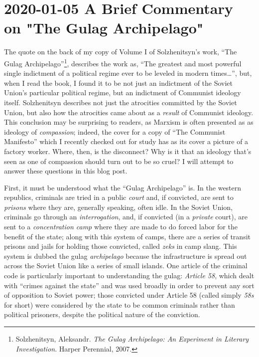 \documentclass{article}
\begin{document}
\section{2020-01-05 A Brief Commentary on "The Gulag Archipelago"}
The quote on the back of my copy of Volume I of Solzhenitsyn's work, ``The Gulag Archipelago''\footnote{Solzhenitsyn, Aleksandr. \textit{The Gulag Archipelago: An Experiment in Literary Investigation}.  Harper Perennial, 2007.}, describes the work as, ``The greatest and most powerful single indictment of a political regime ever to be leveled in modern times\ldots'', but, when I read the book, I found it to be not just an indictment of the Soviet Union's particular political regime, but an indictment of Communist ideology itself.  Solzhenitsyn describes not just the atrocities committed by the Soviet Union, but also how the atrocities came about as a \emph{result} of Communist ideology.  This conclusion may be surprising to readers, as Marxism is often presented as as ideology of \emph{compassion}; indeed, the cover for a copy of ``The Communist Manifesto'' which I recently checked out for study has as its cover a picture of a  factory worker.  Where, then, is the disconnect?  Why is it that an ideology that's seen as one of compassion should turn out to be so cruel?  I will attempt to answer these questions in this blog post.

First, it must be understood what the ``Gulag Archipelago'' is.  In the western republics, criminals are tried in a public \emph{court} and, if convicted, are sent to \emph{prisons} where they are, generally speaking, often idle.  In the Soviet Union, criminals go through an \emph{interrogation}, and, if convicted (in a \emph{private} court), are sent to a \emph{concentration camp} where they are made to do forced labor for the benefit of the state; along with this system of camps, there are a series of transit prisons and jails for holding those convicted, called \emph{zeks} in camp slang.  This system is dubbed the gulag \emph{archipelago} because the infrastructure is spread out across the Soviet Union like a series of small islands.  One article of the criminal code is particularly important to understanding the gulag: \emph{Article 58}, which dealt with ``crimes against the state'' and was used broadly in order to prevent any sort of opposition to Soviet power; those convicted under Article 58 (called simply \emph{58s} for short) were considered by the state to be common criminals rather than political prisoners, despite the political nature of the conviction.
\end{document}
